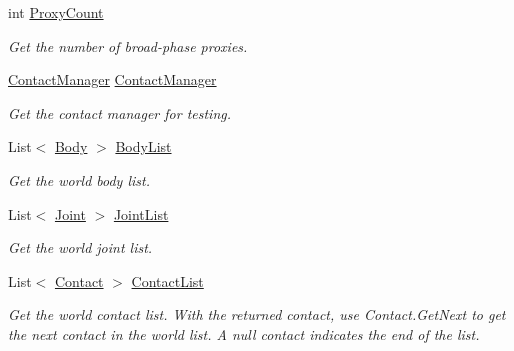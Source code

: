 \begin{DoxyCompactItemize}
\item 
int \hyperlink{class_farseer_physics_1_1_dynamics_1_1_world_a5a99bf76957ac263a5a4fce8b3e960ee}{Proxy\+Count}
\begin{DoxyCompactList}\small\item\em Get the number of broad-\/phase proxies. \end{DoxyCompactList}\item 
\hyperlink{class_farseer_physics_1_1_dynamics_1_1_contact_manager}{Contact\+Manager} \hyperlink{class_farseer_physics_1_1_dynamics_1_1_world_aee911720887213f3461704e10a2ec5cd}{Contact\+Manager}
\begin{DoxyCompactList}\small\item\em Get the contact manager for testing. \end{DoxyCompactList}\item 
List$<$ \hyperlink{class_farseer_physics_1_1_dynamics_1_1_body}{Body} $>$ \hyperlink{class_farseer_physics_1_1_dynamics_1_1_world_a5d727e7ad466b4773d13b46b391c4e18}{Body\+List}
\begin{DoxyCompactList}\small\item\em Get the world body list. \end{DoxyCompactList}\item 
List$<$ \hyperlink{class_farseer_physics_1_1_dynamics_1_1_joints_1_1_joint}{Joint} $>$ \hyperlink{class_farseer_physics_1_1_dynamics_1_1_world_a568001d5076f056870dca126b649a8fe}{Joint\+List}
\begin{DoxyCompactList}\small\item\em Get the world joint list. \end{DoxyCompactList}\item 
List$<$ \hyperlink{class_farseer_physics_1_1_dynamics_1_1_contacts_1_1_contact}{Contact} $>$ \hyperlink{class_farseer_physics_1_1_dynamics_1_1_world_a10c4b997f789d459730a93f2431093d4}{Contact\+List}
\begin{DoxyCompactList}\small\item\em Get the world contact list. With the returned contact, use Contact.\+Get\+Next to get the next contact in the world list. A null contact indicates the end of the list. \end{DoxyCompactList}\item 

\end{DoxyCompactItemize}
